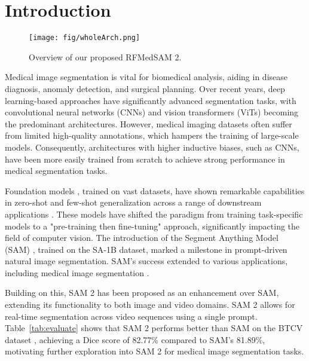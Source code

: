 
\section{Introduction}
\label{sec:intro}

\begin{figure}[!t]
\centering
\texttt{[image: fig/wholeArch.png]}
      \caption{Overview of our proposed RFMedSAM 2.}
\vspace{-0.4cm}
\label{fig:wholeArch}
\end{figure}

Medical image segmentation is vital for biomedical analysis, aiding in disease diagnosis, anomaly detection, and surgical planning. Over recent years, deep learning-based approaches \cite{ronneberger2015u, isensee2019automated, hatamizadeh2022unetr, zhou2021nnformer} have significantly advanced segmentation tasks, with convolutional neural networks (CNNs) and vision transformers (ViTs) becoming the predominant architectures. However, medical imaging datasets often suffer from limited high-quality annotations, which hampers the training of large-scale models. Consequently, architectures with higher inductive biases, such as CNNs, have been more easily trained from scratch to achieve strong performance in medical segmentation tasks.

Foundation models \cite{devlin2018bert, he2022masked}, trained on vast datasets, have shown remarkable capabilities in zero-shot and few-shot generalization across a range of downstream applications \cite{openai2023gpt, radford2021learning}. These models have shifted the paradigm from training task-specific models to a "pre-training then fine-tuning" approach, significantly impacting the field of computer vision. The introduction of the Segment Anything Model (SAM) \cite{kirillov2023segment}, trained on the SA-1B dataset, marked a milestone in prompt-driven natural image segmentation. SAM's success extended to various applications, including medical image segmentation \cite{ma2024segment, xie2024masksam, zhang2024segment, deng2023sam, zhang2023customized, bui2024sam3d}.

Building on this, SAM 2 has been proposed as an enhancement over SAM, extending its functionality to both image and video domains. SAM 2 allows for real-time segmentation across video sequences using a single prompt. Table~\ref{tab:evaluate} shows that SAM 2 performs better than SAM on the BTCV dataset \cite{landman2015miccai}, achieving a Dice score of 82.77\% compared to SAM’s 81.89\%, motivating further exploration into SAM 2 for medical image segmentation tasks.

